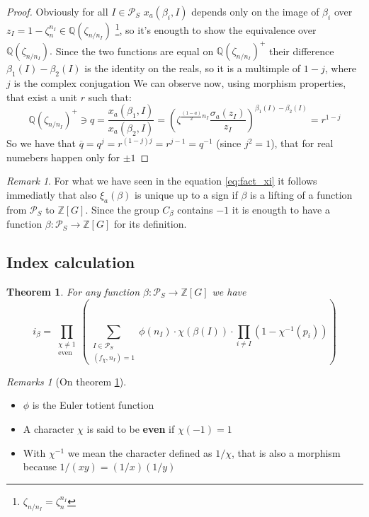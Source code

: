 \documentclass[]{article}
\theoremstyle{plain}
\newtheorem{teo}{Theorem}[section]
\theoremstyle{remark}
\newtheorem*{rem}{Remark}
\newtheorem*{rems}{Remarks}
\theoremstyle{definition}
\newcommand{\PS}{\mathcal{P}_S}
\newcommand{\Z}{\mathbb{Z}}
\newcommand{\Q}{\mathbb{Q}}
\begin{document}
	\begin{proof}
		Obviously for all $ I \in \PS $ $ 	x_a(\beta_i , I) $ depends only on the image of $ \beta_i $ over $ z_I = 1- \zeta_n ^{n_I} \in \Q(\zeta_{n/n_I}) $ \footnote{ $ \zeta_{n/n_I} =  \zeta_n^{n_I} $}, so it's enougth to show the equivalence over $  \Q(\zeta_{n/n_I}). $ Since the two functions are equal on $ \Q(\zeta_{n/n_I})^+ $ their difference $ \beta_1(I) - \beta_2 (I)  $ is the identity on the reals, so it is a multimple of $ 1 - j $, where $ j $ is the complex conjugation %
		We can observe now, using morphism properties, that exist a unit $ r $ such that:
		\begin{equation*}
			\Q (\zeta_{n/n_I})^+ \ni q = \frac{x_a(\beta_1 , I)}{x_a(\beta_2 , I)} = {\left( \zeta ^{\frac{(1-a)}{2} n_I } \frac{\sigma_a (	z_I )}{z_I } \right)  }^{\beta_1(I) - \beta_2 (I)} = r ^{1-j}
		\end{equation*}	
		So we have that $ \overline{q}=q^j = r^{(1-j)j} = r^{j  - 1 }= q^{-1}$ (since $j^2 = 1 $), that for real numebers happen only for $ \pm 1 $
	\end{proof}

	\begin{rem}
		For what we have seen in the equation \ref{eq:fact_xi} it follows immediatly that also $ \xi_a(\beta) $ is unique up to a sign if $\beta$ is a lifting of a function from $ \PS $ to $ \Z[G] $. Since the group $ C_\beta $ contains $ -1 $ it is enougth to have a function $ \beta : \PS \to \Z[G]$ for its definition.
	\end{rem}

	\subsection{Index calculation}
	
	\begin{teo}
		\label{teo:idx1}
		For any function $ \beta : \PS \to \Z [G] $ we have
		\begin{equation}
		\label{eq:idx1}
			i_\beta = \prod_{ \substack{\chi \neq 1 \\ \text{even}}} \left( \sum_{\substack{ I \in \PS \\ (f_\chi , n_I) = 1}} \phi (n_I) \cdot \chi (\beta (I)) \cdot \prod_{i \neq I} (1- \chi^{-1} (p_i)) \right) 
		\end{equation}
	\end{teo}

	\begin{rems}[On theorem \ref{teo:idx1}]
		\begin{itemize}
			\item $\phi$ is the Euler totient function
			\item A character $\chi$ is said to be \textbf{even} if $ \chi (-1) = 1 $
			\item With $ \chi^{-1} $ we mean the character defined as $ 1/\chi $, that is also a morphism because $ 1/(xy) = (1/x)(1/y)$ %
			
			
		\end{itemize}
	\end{rems}
\end{document}
